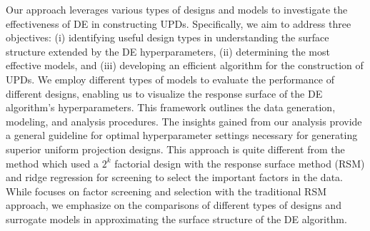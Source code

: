 \documentclass [PhD] {package/uclathes}
\begin{document}
Our approach leverages various types of designs and models to investigate the effectiveness of DE in constructing UPDs. Specifically, we aim to address three  objectives: (i) identifying useful design types in understanding the surface structure extended by the DE hyperparameters, (ii) determining the most effective models, and (iii) developing an efficient algorithm for the construction of UPDs. We employ different types of models to evaluate the performance of different designs, enabling us to visualize the response surface of the DE algorithm's hyperparameters. This framework outlines the data generation, modeling, and analysis procedures. The insights gained from our analysis provide a general guideline for optimal hyperparameter settings necessary for generating superior uniform projection designs.%
This approach is quite different from the \textcite{lujan2018design} method which used a $2^k$ factorial design with the response surface method (RSM) and ridge regression for screening to select the important factors in the data. While \textcite{lujan2018design} focuses on factor screening and selection with the traditional RSM approach, we emphasize on the comparisons of different types of designs and surrogate models in approximating the surface structure of the DE algorithm.

\end{document}
